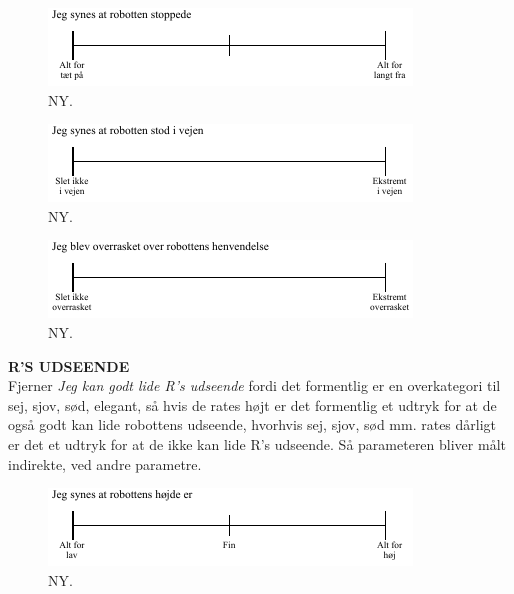 \noindent
%
%
\begin{figure}[H]
\centering
\includegraphics[width =\textwidth]{Figure/UdvalgteSkalaer/RStoppede} 
\caption{NY.}
\label{fig:SkalaRStoppede}
\end{figure}
\noindent
%
%
\begin{figure}[H]
\centering
\includegraphics[width =\textwidth]{Figure/UdvalgteSkalaer/RobottenErIVejen} 
\caption{NY.}
\label{fig:SkalaRerIVejen}
\end{figure}
\noindent
%
%
\begin{figure}[H]
\centering
\includegraphics[width =\textwidth]{Figure/UdvalgteSkalaer/OverrasketOverR} 
\caption{NY.}
\label{fig:SkalaOverrasketOverR}
\end{figure}
\noindent
%
\textbf{R'S UDSEENDE}\\
Fjerner \textit{Jeg kan godt lide R's udseende} fordi det formentlig er en overkategori til sej, sjov, sød, elegant, så hvis de rates højt er det formentlig et udtryk for at de også godt kan lide robottens udseende, hvorhvis sej, sjov, sød mm. rates dårligt er det et udtryk for at de ikke kan lide R's udseende. Så parameteren bliver målt indirekte, ved andre parametre.
%
\begin{figure}[H]
\centering
\includegraphics[width =\textwidth]{Figure/UdvalgteSkalaer/HoejdeR} 
\caption{NY.}
\label{fig:SkalaHoejdeR}
\end{figure}

